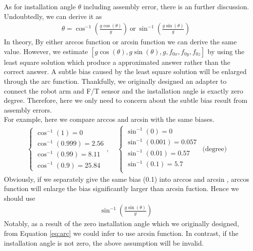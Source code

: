 As for installation angle $\theta$ including assembly error,  there is an further discussion. Undoubtedly, we can derive it as
\begin{equation}
\begin{split}
\theta = \cos^{-1}\left(\frac{g\cos(\theta)}{g}\right)\ \text{or} \ \sin^{-1}\left(\frac{g\sin(\theta)}{g}\right)\
\end{split}
\end{equation}
In theory, By either arccos function or arcsin function we can derive the same value. However, we estimate $[g\cos(\theta),g\sin(\theta),g,f_{0x},f_{0y},f_{0z}]$ by using the least square solution which produce a approximated answer rather than the correct answer. A subtle bias caused by the least square solution will be enlarged through the arc function. 
Thankfully, we originally designed an adapter to connect the robot arm and F/T sensor and the installation angle is exactly zero degree. Therefore, here we only need to concern about the subtle bias result from assembly errors.\\
For example, here we compare arccos and arcsin with the same biases.
\begin{equation}\label{eq:arc}
\begin{split}
\left\{\begin{matrix}
\cos^{-1}(1) = 0\\
\cos^{-1}(0.999) = 2.56\\
\cos^{-1}(0.99) = 8.11\\
\cos^{-1}(0.9) = 25.84
\end{matrix}\right.,\ \ \ \ \    
\left\{\begin{matrix}
\sin^{-1}(0) = 0\\
\sin^{-1}(0.001) = 0.057\\
\sin^{-1}(0.01) = 0.57\\
\sin^{-1}(0.1) = 5.7\\
\end{matrix}\right.\ \  
\text{(degree)}
\end{split}
\end{equation}
Obviously, if we separately give the same bias (0.1) into arccos and arcsin , arccos function will enlarge the bias significantly larger than arcsin fuction. Hence we should use
\begin{equation}
\begin{split}
\sin^{-1}\left(\frac{g\sin(\theta)}{g}\right)\
\end{split}
\end{equation}
Notably, as a result of the zero installation angle which we originally designed, from Equation \ref{eq:arc} we could infer to use arcsin function. In contrast, if the installation angle is not zero, the above assumption will be invalid.

